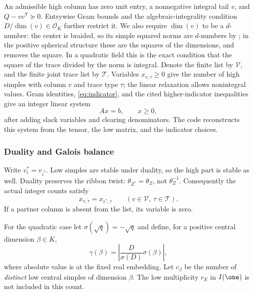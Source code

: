 An admissible high column has zero unit entry, a nonnegative integral
tail $v$, and $Q-vv^{\mathsf T}\succeq0$. Entrywise Gram bounds and the
algebraic-integrality condition $D/\dim(v)\in\mathcal O_K$ further
restrict it. We also require $\dim(v)$ to be a $d$-number: the center
is braided, so its simple squared norms are $d$-numbers by
\cite[Theorem~1.8]{Ocode}; in the positive spherical structure these
are the squares of the dimensions, and
\cite[Corollary~2.9]{Ocode} removes the square. In a quadratic field
this is the exact condition that the square of the trace divided by
the norm is integral. Denote the finite list by $\mathcal V$, and the finite
joint trace list by $\mathcal T$. Variables $x_{v,\tau}\ge0$ give the
number of high simples with column $v$ and trace type $\tau$; the
linear relaxation allows nonintegral values. Gram identities,
\eqref{eq:indicator}, and the cited higher-indicator inequalities give
an integer linear system
\begin{equation}\label{eq:lp}
 Ax=b,\qquad x\ge0,
\end{equation}
after adding slack variables and clearing denominators. The code
reconstructs this system from the tensor, the low matrix, and the
indicator choices.

\subsubsection{Duality and Galois balance}
Write $v^*_i=v_{i^*}$. Low simples are stable under duality, so the high
part is stable as well. Duality preserves the ribbon twist:
$\theta_{Z^*}=\theta_Z$, not $\theta_Z^{-1}$. Consequently the
actual integer counts satisfy
\begin{equation}\label{eq:dualbalance}
 x_{v,\tau}=x_{v^*,\tau}
 \qquad(v\in\mathcal V,\ \tau\in\mathcal T).
\end{equation}
If a partner column is absent from the list, its variable is zero.

For the quadratic case let $\sigma(\sqrt q)=-\sqrt q$ and define, for
a positive central dimension $\beta\in K$,
\begin{equation}\label{eq:gammadim}
 \gamma(\beta)=\left|\frac{D}{\sigma(D)}\sigma(\beta)\right|,
\end{equation}
where absolute value is at the fixed real embedding. Let $c_\beta$ be
the number of \emph{distinct} low central simples of dimension $\beta$.
The low multiplicity $r_E$ in $I(\one)$ is not included in this count.

